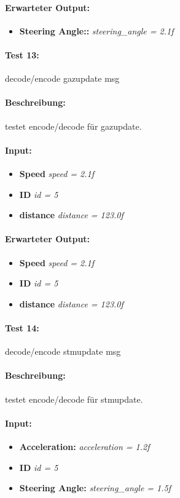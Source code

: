 \documentclass[a4paper, 12pt, titlepage]{scrartcl}
\begin{document}
{			\paragraph{Erwarteter Output:}
			\begin{itemize} \itemsep-0.5em
				\item \textbf{Steering Angle::} \emph{steering\_angle = 2.1f}
			\end{itemize}
			
			\paragraph{Test 13:}{decode/encode gazupdate msg}
			\paragraph{Beschreibung:} testet encode/decode für gazupdate.
			\paragraph{Input:}
			\begin{itemize} \itemsep-0.5em
				\item \textbf{Speed} \emph{speed = 2.1f}
				\item \textbf{ID} \emph{id = 5}
				\item \textbf{distance} \emph{distance = 123.0f}
			\end{itemize}
			\paragraph{Erwarteter Output:}
			\begin{itemize} \itemsep-0.5em
				\item \textbf{Speed} \emph{speed = 2.1f}
				\item \textbf{ID} \emph{id = 5}
				\item \textbf{distance} \emph{distance = 123.0f}
			\end{itemize}
			
			\paragraph{Test 14:}{decode/encode stmupdate msg}
			\paragraph{Beschreibung:} testet encode/decode für stmupdate.
			\paragraph{Input:}
			\begin{itemize} \itemsep-0.5em
				\item \textbf{Acceleration:} \emph{acceleration = 1.2f}
				\item \textbf{ID} \emph{id = 5}
				\item \textbf{Steering Angle:} \emph{steering\_angle = 1.5f}
			\end{itemize}
}
\end{document}
